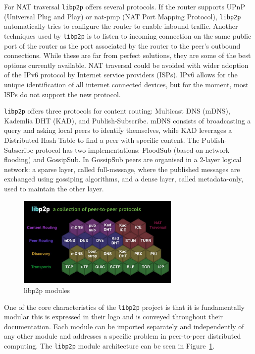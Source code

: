 For NAT traversal \verb+libp2p+ offers several protocols. If the router supports UPnP (Universal Plug and Play) or nat-pmp (NAT Port Mapping Protocol), \verb+libp2p+ automatically tries to configure the router to enable inbound traffic. Another techniques used by \verb+libp2p+ is to listen to incoming connection on the same public port of the router as the port associated by the router to the peer's outbound connections. While these are far from perfect solutions, they are some of the best options currently available. NAT traversal could be avoided with wider adoption of the IPv6 protocol by Internet service providers (ISPs). IPv6 allows for the unique identification of all internet connected devices, but for the moment, most ISPs do not support the new protocol.

\verb+libp2p+ offers three protocols for content routing: Multicast DNS (mDNS), Kademlia DHT (KAD), and Publish-Subscribe. mDNS consists of broadcasting a query and asking local peers to identify themselves, while KAD leverages a Distributed Hash Table to find a peer with specific content. The Publish-Subscribe protocol has two implementations: FloodSub (based on network flooding) and GossipSub. In GossipSub peers are organised in a 2-layer logical network: a sparse layer, called full-message, where the published messages are exchanged using gossiping algorithms, and a dense layer, called metadata-only, used to maintain the other layer.\cite{guidi2021libp2p}

\begin{figure}[ht]
    \centering
    \includegraphics[width=0.7\textwidth]{imgs/libp2p.jpeg}
    \caption{libp2p modules}
    \label{fig:libp2pModules}
\end{figure}

One of the core characteristics of the \verb+libp2p+ project is that it is fundamentally modular this is expressed in their logo and is conveyed throughout their documentation. Each module can be imported separately and independently of any other module and addresses a specific problem in peer-to-peer distributed computing. The \verb+libp2p+ module architecture can be seen in Figure~\ref{fig:libp2pModules}.
